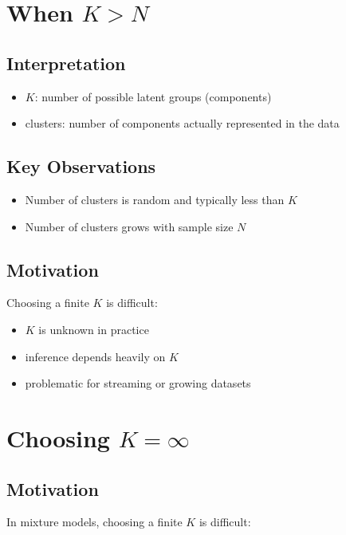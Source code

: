 \documentclass[12pt,oneside]{book}
\numberwithin{equation}{section}
\theoremstyle{definition}
\theoremstyle{plain}
\theoremstyle{remark}
\begin{document}
\section{When $K > N$}

\subsection*{Interpretation}

\begin{itemize}
\item $K$: number of possible latent groups (components)
\item clusters: number of components actually represented in the data
\end{itemize}

\subsection*{Key Observations}

\begin{itemize}
\item Number of clusters is random and typically less than $K$
\item Number of clusters grows with sample size $N$
\end{itemize}

\subsection*{Motivation}

Choosing a finite $K$ is difficult:
\begin{itemize}
\item $K$ is unknown in practice
\item inference depends heavily on $K$
\item problematic for streaming or growing datasets
\end{itemize}

\section{Choosing $K = \infty$}

\subsection*{Motivation}

In mixture models, choosing a finite $K$ is difficult:
\end{document}
